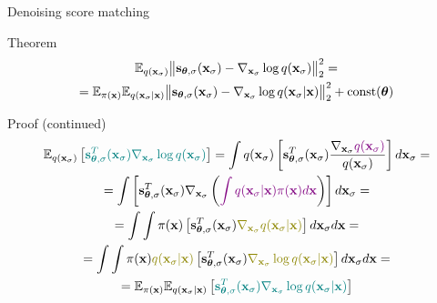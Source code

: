 \begin{frame}{Denoising score matching}
	\begin{block}{Theorem}
	\vspace{-0.5cm}
	\begin{multline*}
		\mathbb{E}_{q(\mathbf{x}_{\sigma})}\bigl\| \mathbf{s}_{\boldsymbol{\theta}, \sigma}(\mathbf{x}_{\sigma}) - \nabla_{\mathbf{x}_{\sigma}} \log q(\mathbf{x}_{\sigma}) \bigr\|^2_2 = \\
		= \mathbb{E}_{\pi(\mathbf{x})} \mathbb{E}_{q(\mathbf{x}_{\sigma} | \mathbf{x})}\bigl\| \mathbf{s}_{\boldsymbol{\theta}, \sigma}(\mathbf{x}_{\sigma}) - \nabla_{\mathbf{x}_{\sigma}} \log q(\mathbf{x}_{\sigma} | \mathbf{x}) \bigr\|^2_2 + \text{const}(\boldsymbol{\theta})
	\end{multline*}
	\vspace{-0.5cm}
	\end{block}
	\begin{block}{Proof (continued)}
		\vspace{-0.7cm}
		{\small
		\begin{multline*}
			\bbE_{q(\bx_{\sigma})} \left[{\color{teal}\bs_{\btheta, \sigma}^T(\bx_{\sigma}) \nabla_{\bx_{\sigma}} \log q(\bx_{\sigma})} \right] = \int q(\bx_{\sigma}) \left[\bs_{\btheta, \sigma}^T(\bx_{\sigma}) \frac{\nabla_{\bx_{\sigma}} {\color{violet}q(\bx_{\sigma})}}{q(\bx_{\sigma})} \right] d\bx_{\sigma} = \\
			= \int \left[\bs_{\btheta, \sigma}^T(\bx_{\sigma}) \nabla_{\bx_{\sigma}}\left({\color{violet}\int q(\bx_{\sigma} | \bx) \pi(\bx) d\bx}\right) \right] d\bx_{\sigma} = \\
			=  \int \int \pi(\bx) \left[\bs_{\btheta, \sigma}^T(\bx_{\sigma}) {\color{olive}\nabla_{\bx_{\sigma}}q(\bx_{\sigma} | \bx)} \right] d\bx_{\sigma} d\bx = \\
			= \int \int \pi(\bx) {\color{olive} q(\bx_{\sigma} | \bx)} \left[\bs_{\btheta, \sigma}^T(\bx_{\sigma}) {\color{olive}\nabla_{\bx_{\sigma}} \log q(\bx_{\sigma} | \bx)} \right] d\bx_{\sigma} d\bx = \\
			= \bbE_{\pi(\bx)} \bbE_{q(\bx_{\sigma} | \bx)} \left[{\color{teal}\bs_{\btheta, \sigma}^T(\bx_{\sigma}) \nabla_{\bx_{\sigma}} \log q(\bx_{\sigma} | \bx)} \right]
		\end{multline*}
		}
	\end{block}
\end{frame}
